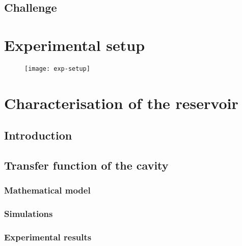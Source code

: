 
\subsection{Challenge}


\section{Experimental setup}


\begin{figure}[h]
	\centering
	\texttt{[image: exp-setup]}
\end{figure}


\section{Characterisation of the reservoir}


\subsection{Introduction}


\subsection{Transfer function of the cavity}


\subsubsection{Mathematical model}


\subsubsection{Simulations}


\subsubsection{Experimental results}


